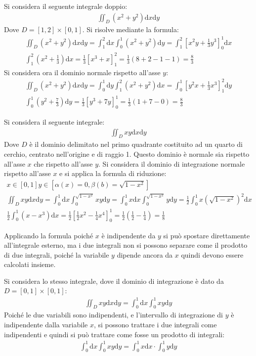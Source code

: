 \documentclass{article}
\newcommand{\df}{\mathrm{d}}
\numberwithin{equation}{subsection}
\begin{document}
Si considera il seguente integrale doppio:
\begin{gather*}
    \iint_D(x^2+y^2)\df x\df y
\end{gather*}
Dove $D=[1,2]\times[0,1]$.
Si risolve mediante la formula:
\begin{gather*}
    \iint_D(x^2+y^2)\df x\df y=\int_1^2\df x\int_0^1(x^2+y^2)\df y=\int_1^2\left[x^2y+\frac{1}{3}y^3\right]_0^1\df x\\
    \int_1^2\left(x^2+\frac{1}{3}\right)\df x=\frac{1}{3}\left[x^3+x\right]_1^2=\frac{1}{3}(8+2-1-1)=\frac{8}{3}
\end{gather*}
Si considera ora il dominio normale rispetto all'asse $y$:
\begin{gather*}
    \iint_D(x^2+y^2)\df x\df y=\int_0^1\df y\int_1^2(x^2+y^2)\df x=
    \int_0^1\left[y^2x+\frac{1}{3}x^3\right]_1^2\df y\\
    \int_0^1\left(y^2+\frac{7}{3}\right)\df y=\frac{1}{3}\left[y^3+7y\right]_0^1=\frac{1}{3}(1+7-0)=\frac{8}{3}
\end{gather*}


Si considera il seguente integrale:
\begin{gather*}
    \iint_D xy\df x \df y
\end{gather*}
Dove $D$ è il dominio delimitato nel primo quadrante costituito ad un quarto di cerchio, centrato nell'origine e di raggio 1. Questo dominio è normale sia rispetto all'asse $x$ che rispetto all'asse $y$. Si considera il dominio di integrazione normale rispetto all'asse $x$ e si applica la formula di riduzione:
\begin{gather*}
    x\in[0,1]
    y\in\left[\alpha(x)=0,\beta(b)=\sqrt{1-x^2}\right]\\
    \iint_D xy\df x \df y=\int_0^1\df x\int_0^{\sqrt{1-x^2}}xy\df y=\int_0^1 x\df x\int_0^{\sqrt{1-x^2}}y\df y=
    \frac{1}{2}\int_0^1 x\left(\sqrt{1-x^2}\right)^2\df x\\
    \frac{1}{2}\int_0^1 (x-x^3)\df x=\frac{1}{2}\left[\frac{1}{2}x^2-\frac{1}{4}x^4\right]_0^1=\frac{1}{2}\left(\frac{1}{2}-\frac{1}{4}\right)=\frac{1}{8}
\end{gather*}

Applicando la formula poiché $x$ è indipendente da $y$ si può spostare direttamente all'integrale esterno, ma i due integrali non si possono separare come il prodotto di due integrali, poiché la variabile $y$ dipende ancora da $x$ quindi devono essere calcolati insieme. 

Si considera lo stesso integrale, dove il dominio di integrazione è dato da $D=[0,1]\times[0,1]$:
\begin{gather*}
    \iint_D xy\df x\df y=\int_0^1\df x\int_0^1 xy\df y
\end{gather*}
Poiché le due variabili sono indipendenti, e l'intervallo di integrazione di $y$ è indipendente dalla variabile $x$, si possono trattare i due integrali come indipendenti e quindi si può trattare come fosse un prodotto di integrali:
\begin{gather*}
    \int_0^1\df x\int_0^1 xy\df y=\int_0^1 x\df x\cdot\int_0^1 y\df y
\end{gather*}
\end{document}
